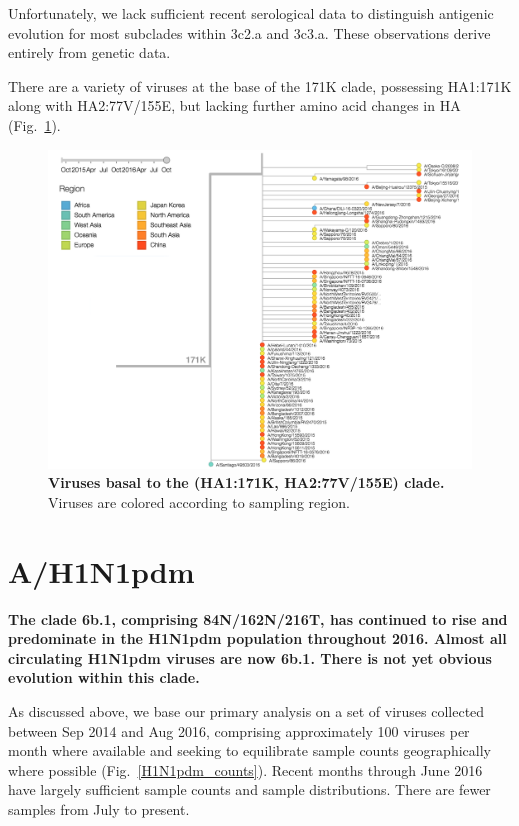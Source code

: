 \documentclass[11pt,oneside,letterpaper]{article}
\begin{document}
Unfortunately, we lack sufficient recent serological data to distinguish antigenic evolution for most subclades within 3c2.a and 3c3.a. These observations derive entirely from genetic data.

\pagebreak

There are a variety of viruses at the base of the 171K clade, possessing HA1:171K along with HA2:77V/155E, but lacking further amino acid changes in HA (Fig.\ \ref{H3N2_171K_basal}).

\begin{figure}[h!]
	\centering
	\includegraphics[width=1.0\textwidth]{../figures/sep-2016/H3N2_171K_basal.png}
	\caption{\textbf{Viruses basal to the (HA1:171K, HA2:77V/155E) clade.}
	Viruses are colored according to sampling region.
	}
	\label{H3N2_171K_basal}
\end{figure}

\clearpage
\pagebreak

\section*{A/H1N1pdm}

\textbf{The clade 6b.1, comprising 84N/162N/216T, has continued to rise and predominate in the H1N1pdm population throughout 2016. Almost all circulating H1N1pdm viruses are now 6b.1. There is not yet obvious evolution within this clade.}

As discussed above, we base our primary analysis on a set of viruses collected between Sep 2014 and Aug 2016, comprising approximately 100 viruses per month where available and seeking to equilibrate sample counts geographically where possible (Fig.\ \ref{H1N1pdm_counts}). Recent months through June 2016 have largely sufficient sample counts and sample distributions. There are fewer samples from July to present.
\end{document}
